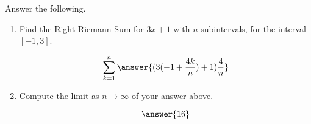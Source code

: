 \documentclass{ximera}
\author{Gregory Hartman \and Matthew Carr}
\begin{document}
\begin{exercise}


Answer the following.

\begin{enumerate}
\item Find the Right Riemann Sum for $3x+1$ with $n$ subintervals, for the interval $[-1,3]$.
\begin{prompt}
\[
\sum_{k=1}^n \answer{(3(-1+\frac{4k}{n})+1)\frac{4}{n}}
\]
\end{prompt}
\item Compute the limit as $n\to\infty$ of your answer above. \begin{prompt} \[\answer{16}\]
\end{prompt}

\end{enumerate}
\end{exercise}
\end{document}
